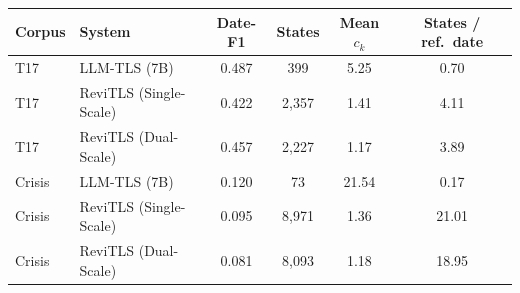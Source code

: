 \begin{tabular}{@{}llcccc@{}}
\toprule
\textbf{Corpus} & \textbf{System} & \textbf{Date-F1} & \textbf{States} & \textbf{Mean $c_k$} & \textbf{States / ref.\ date} \\
\midrule
T17 & LLM-TLS (7B) & 0.487 & 399 & 5.25 & 0.70 \\
T17 & ReviTLS (Single-Scale) & 0.422 & 2,357 & 1.41 & 4.11 \\
T17 & ReviTLS (Dual-Scale) & 0.457 & 2,227 & 1.17 & 3.89 \\
Crisis & LLM-TLS (7B) & 0.120 & 73 & 21.54 & 0.17 \\
Crisis & ReviTLS (Single-Scale) & 0.095 & 8,971 & 1.36 & 21.01 \\
Crisis & ReviTLS (Dual-Scale) & 0.081 & 8,093 & 1.18 & 18.95 \\
\bottomrule
\end{tabular}
